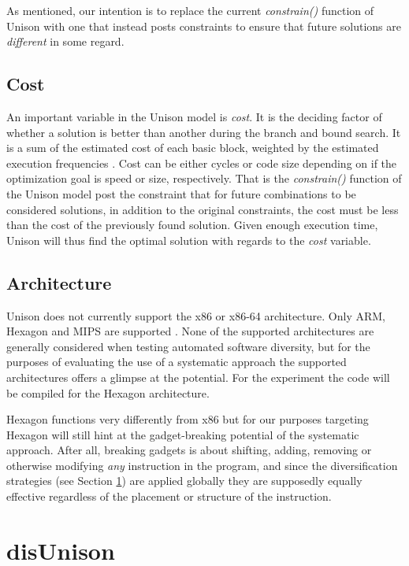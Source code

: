 As mentioned, our intention is to replace the current \textit{constrain()} function of
Unison with one that instead posts constraints to ensure that future solutions are
\textit{different} in some regard.

\subsection{Cost}
\label{sec:cost}

An important variable in the Unison model is \textit{cost}. It is the deciding factor
of whether a solution is better than another during the branch and bound search. It is a
sum of the estimated cost of each basic block, weighted by the estimated execution
frequencies \cite{unison-docs}. Cost can be either cycles or code size depending on if the
optimization goal is speed or size, respectively. That is the \textit{constrain()} function
of the Unison model post the constraint that for future combinations to be considered
solutions, in addition to the original constraints, the cost must be less than the cost of
the previously found solution. Given enough execution time, Unison will thus find the
optimal solution with regards to the \textit{cost} variable.

\subsection{Architecture}
\label{sec:arch}

Unison does not currently support the x86 or x86-64 architecture. Only ARM, Hexagon and MIPS
are supported \cite{unison-src}. None of the supported architectures are generally considered
when testing automated software diversity, but for the purposes of evaluating the use of
a systematic approach the supported architectures offers a glimpse at the potential. For
the experiment the code will be compiled for the Hexagon architecture.

Hexagon functions very differently from x86 but for our purposes targeting Hexagon will
still hint at the gadget-breaking potential of the systematic approach. After all,
breaking gadgets is about shifting, adding, removing or otherwise modifying \textit{any}
instruction in the program, and since the diversification strategies (see Section
\ref{sec:disUnison}) are applied globally they are supposedly equally effective regardless
of the placement or structure of the instruction.

\section{disUnison}
\label{sec:disUnison}

